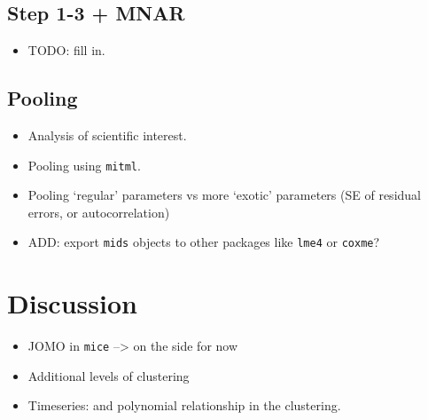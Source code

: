 \documentclass[
]{jss}
\providecommand{\tightlist}{%
  \setlength{\itemsep}{0pt}\setlength{\parskip}{0pt}}
\begin{document}
\hypertarget{step-1-3-mnar}{%
\subsection{Step 1-3 + MNAR}\label{step-1-3-mnar}}

\begin{itemize}
\tightlist
\item
  TODO: fill in.
\end{itemize}

\hypertarget{pooling}{%
\subsection{Pooling}\label{pooling}}

\begin{itemize}
\item
  Analysis of scientific interest.
\item
  Pooling using \texttt{mitml}.
\item
  Pooling `regular' parameters vs more `exotic' parameters (SE of
  residual errors, or autocorrelation)
\item
  ADD: export \texttt{mids} objects to other packages like \texttt{lme4}
  or \texttt{coxme}?
\end{itemize}

\hypertarget{discussion}{%
\section{Discussion}\label{discussion}}

\begin{itemize}
\item
  JOMO in \texttt{mice} --\textgreater{} on the side for now
\item
  Additional levels of clustering
\item
  Timeseries: and polynomial relationship in the clustering.
\end{itemize}

\renewcommand\refname{References}

\end{document}
